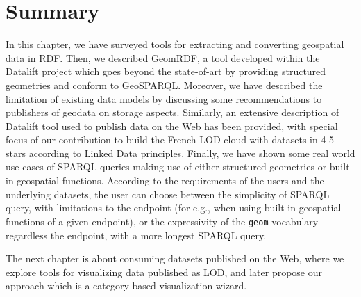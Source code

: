 \section{Summary}
\label{sec:ch2-summary}
In this chapter, we have surveyed tools for extracting and converting geospatial data in RDF. Then, we described GeomRDF, a tool developed within the Datalift project which goes beyond the state-of-art by providing structured geometries and conform to GeoSPARQL. Moreover, we have described the limitation of existing data models by discussing some recommendations to publishers of geodata on storage aspects. Similarly, an extensive description of Datalift tool used to publish data on the Web has been provided, with special focus of our contribution to build the French LOD cloud with datasets in 4-5 stars according to Linked Data principles. Finally, we have shown some real world use-cases of SPARQL queries making use of either structured geometries or built-in geospatial functions. According to the requirements of the users and the underlying datasets, the user can choose between the simplicity of SPARQL query, with limitations to the endpoint (for e.g., when using built-in geospatial functions of a given endpoint), or the expressivity of the \texttt{geom} vocabulary regardless the endpoint, with a more longest SPARQL query.   


The next chapter is about consuming datasets published on the Web, where we explore tools for visualizing data published as LOD, and later propose our approach which is a category-based visualization wizard. 